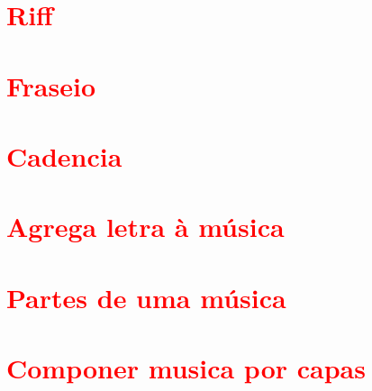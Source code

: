 \section{\textcolor{red}{Riff}}

\section{\textcolor{red}{Fraseio}}


\section{\textcolor{red}{Cadencia}}


\section{\textcolor{red}{Agrega letra à música}}


\section{\textcolor{red}{Partes de uma música}}

\section{\textcolor{red}{Componer musica por capas}}


